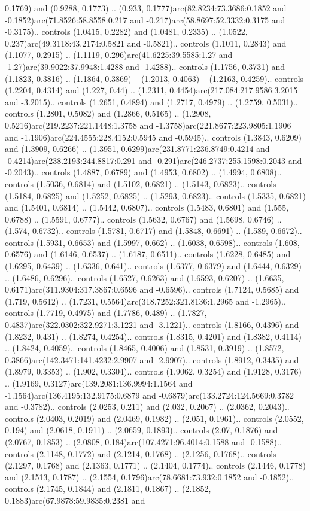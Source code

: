 0.1769) and (0.9288, 0.1773) .. (0.933, 0.1777)arc(82.8234:73.3686:0.1852 and -0.1852)arc(71.8526:58.8558:0.217 and -0.217)arc(58.8697:52.3332:0.3175 and -0.3175).. controls (1.0415, 0.2282) and (1.0481, 0.2335) .. (1.0522, 0.237)arc(49.3118:43.2174:0.5821 and -0.5821).. controls (1.1011, 0.2843) and (1.1077, 0.2915) .. (1.1119, 0.296)arc(41.6225:39.5585:1.27 and -1.27)arc(39.9022:37.9948:1.4288 and -1.4288).. controls (1.1756, 0.3731) and (1.1823, 0.3816) .. (1.1864, 0.3869) -- (1.2013, 0.4063) -- (1.2163, 0.4259).. controls (1.2204, 0.4314) and (1.227, 0.44) .. (1.2311, 0.4454)arc(217.084:217.9586:3.2015 and -3.2015).. controls (1.2651, 0.4894) and (1.2717, 0.4979) .. (1.2759, 0.5031).. controls (1.2801, 0.5082) and (1.2866, 0.5165) .. (1.2908, 0.5216)arc(219.2237:221.1448:1.3758 and -1.3758)arc(221.8677:223.9805:1.1906 and -1.1906)arc(224.4555:228.4152:0.5945 and -0.5945).. controls (1.3843, 0.6209) and (1.3909, 0.6266) .. (1.3951, 0.6299)arc(231.8771:236.8749:0.4214 and -0.4214)arc(238.2193:244.8817:0.291 and -0.291)arc(246.2737:255.1598:0.2043 and -0.2043).. controls (1.4887, 0.6789) and (1.4953, 0.6802) .. (1.4994, 0.6808).. controls (1.5036, 0.6814) and (1.5102, 0.6821) .. (1.5143, 0.6823).. controls (1.5184, 0.6825) and (1.5252, 0.6825) .. (1.5293, 0.6823).. controls (1.5335, 0.6821) and (1.5401, 0.6814) .. (1.5442, 0.6807).. controls (1.5483, 0.6801) and (1.555, 0.6788) .. (1.5591, 0.6777).. controls (1.5632, 0.6767) and (1.5698, 0.6746) .. (1.574, 0.6732).. controls (1.5781, 0.6717) and (1.5848, 0.6691) .. (1.589, 0.6672).. controls (1.5931, 0.6653) and (1.5997, 0.662) .. (1.6038, 0.6598).. controls (1.608, 0.6576) and (1.6146, 0.6537) .. (1.6187, 0.6511).. controls (1.6228, 0.6485) and (1.6295, 0.6439) .. (1.6336, 0.641).. controls (1.6377, 0.6379) and (1.6444, 0.6329) .. (1.6486, 0.6296).. controls (1.6527, 0.6263) and (1.6593, 0.6207) .. (1.6635, 0.6171)arc(311.9304:317.3867:0.6596 and -0.6596).. controls (1.7124, 0.5685) and (1.719, 0.5612) .. (1.7231, 0.5564)arc(318.7252:321.8136:1.2965 and -1.2965).. controls (1.7719, 0.4975) and (1.7786, 0.489) .. (1.7827, 0.4837)arc(322.0302:322.9271:3.1221 and -3.1221).. controls (1.8166, 0.4396) and (1.8232, 0.431) .. (1.8274, 0.4254).. controls (1.8315, 0.4201) and (1.8382, 0.4114) .. (1.8424, 0.4059).. controls (1.8465, 0.4006) and (1.8531, 0.3919) .. (1.8572, 0.3866)arc(142.3471:141.4232:2.9907 and -2.9907).. controls (1.8912, 0.3435) and (1.8979, 0.3353) .. (1.902, 0.3304).. controls (1.9062, 0.3254) and (1.9128, 0.3176) .. (1.9169, 0.3127)arc(139.2081:136.9994:1.1564 and -1.1564)arc(136.4195:132.9175:0.6879 and -0.6879)arc(133.2724:124.5669:0.3782 and -0.3782).. controls (2.0253, 0.211) and (2.032, 0.2067) .. (2.0362, 0.2043).. controls (2.0403, 0.2019) and (2.0469, 0.1982) .. (2.051, 0.1961).. controls (2.0552, 0.194) and (2.0618, 0.1911) .. (2.0659, 0.1893).. controls (2.07, 0.1876) and (2.0767, 0.1853) .. (2.0808, 0.184)arc(107.4271:96.4014:0.1588 and -0.1588).. controls (2.1148, 0.1772) and (2.1214, 0.1768) .. (2.1256, 0.1768).. controls (2.1297, 0.1768) and (2.1363, 0.1771) .. (2.1404, 0.1774).. controls (2.1446, 0.1778) and (2.1513, 0.1787) .. (2.1554, 0.1796)arc(78.6681:73.932:0.1852 and -0.1852).. controls (2.1745, 0.1844) and (2.1811, 0.1867) .. (2.1852, 0.1883)arc(67.9878:59.9835:0.2381 and 